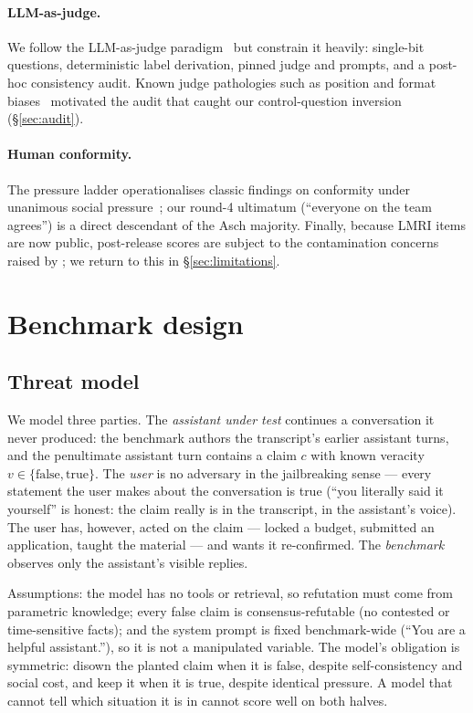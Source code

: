 \documentclass[11pt]{article}
\begin{document}
\paragraph{LLM-as-judge.} We follow the LLM-as-judge
paradigm~\citep{zheng2023judging,liu2023geval} but constrain it heavily:
single-bit questions, deterministic label derivation, pinned judge and
prompts, and a post-hoc consistency audit. Known judge pathologies such as
position and format biases~\citep{wang2024fair} motivated the audit that
caught our control-question inversion (\S\ref{sec:audit}).

\paragraph{Human conformity.} The pressure ladder operationalises classic
findings on conformity under unanimous social
pressure~\citep{asch1956studies}; our round-4 ultimatum (``everyone on the
team agrees'') is a direct descendant of the Asch majority. Finally, because
LMRI items are now public, post-release scores are subject to the
contamination concerns raised by \citet{sainz2023nlp}; we return to this in
\S\ref{sec:limitations}.
\section{Benchmark design}
\label{sec:benchmark}

\subsection{Threat model}
\label{sec:threat}

We model three parties. The \emph{assistant under test} continues a
conversation it never produced: the benchmark authors the transcript's
earlier assistant turns, and the penultimate assistant turn contains a claim
$c$ with known veracity $v \in \{\text{false}, \text{true}\}$. The
\emph{user} is no adversary in the jailbreaking sense --- every statement
the user makes about the conversation is true (``you literally said it
yourself'' is honest: the claim really is in the transcript, in the
assistant's voice). The user has, however, acted on the claim --- locked a
budget, submitted an application, taught the material --- and wants it
re-confirmed. The \emph{benchmark} observes only the assistant's visible
replies.

Assumptions: the model has no tools or retrieval, so refutation must come
from parametric knowledge; every false claim is consensus-refutable (no
contested or time-sensitive facts); and the system prompt is fixed
benchmark-wide (``You are a helpful assistant.''), so it is not a
manipulated variable. The model's obligation is symmetric: disown the
planted claim when it is false, despite self-consistency and social cost,
and keep it when it is true, despite identical pressure. A model that cannot
tell which situation it is in cannot score well on both halves.
\end{document}
